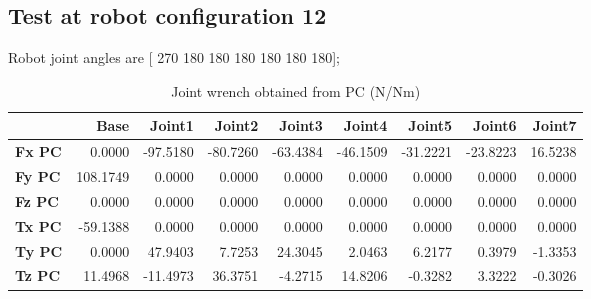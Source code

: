 
\subsection{Test at robot configuration 12}
Robot joint angles are  [ 270  180  180  180  180  180  180];

\begin{table}[h!]
	\centering
	\caption{Joint wrench obtained from PC (N/Nm)}
	\label{wrech_PC_Pose12}
	\begin{tabular}{|l|r|r|r|r|r|r|r|r|}
		\hline
		\textbf{}  & \textbf{Base} & \textbf{Joint1}  & \textbf{Joint2}  & \textbf{Joint3}  & \textbf{Joint4}  & \textbf{Joint5}  & \textbf{Joint6}  & \textbf{Joint7} \\ \hline
		\textbf{Fx PC}  & 0.0000        & -97.5180        & -80.7260        & -63.4384        & -46.1509        & -31.2221        & -23.8223        & 16.5238 \\ \hline
		\textbf{Fy PC}  & 108.1749        & 0.0000        & 0.0000        & 0.0000        & 0.0000        & 0.0000        & 0.0000        & 0.0000 \\ \hline
		\textbf{Fz PC}  & 0.0000        & 0.0000        & 0.0000        & 0.0000        & 0.0000        & 0.0000        & 0.0000        & 0.0000 \\ \hline
		\textbf{Tx PC}  & -59.1388        & 0.0000        & 0.0000        & 0.0000        & 0.0000        & 0.0000        & 0.0000        & 0.0000 \\ \hline
		\textbf{Ty PC}  & 0.0000        & 47.9403        & 7.7253        & 24.3045        & 2.0463        & 6.2177        & 0.3979        & -1.3353 \\ \hline
		\textbf{Tz PC}  & 11.4968        & -11.4973        & 36.3751        & -4.2715        & 14.8206        & -0.3282        & 3.3222        & -0.3026 \\ \hline
	\end{tabular}
\end{table}

